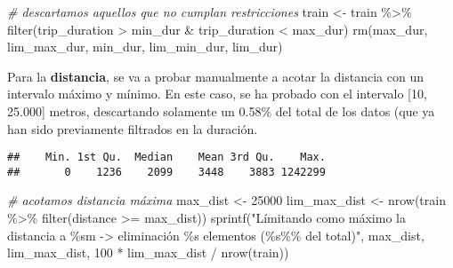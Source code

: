 \documentclass[
]{article}
\newenvironment{Shaded}{\begin{snugshade}}{\end{snugshade}}
\newcommand{\CommentTok}[1]{\textcolor[rgb]{0.56,0.35,0.01}{\textit{#1}}}
\newcommand{\DecValTok}[1]{\textcolor[rgb]{0.00,0.00,0.81}{#1}}
\newcommand{\FunctionTok}[1]{\textcolor[rgb]{0.00,0.00,0.00}{#1}}
\newcommand{\NormalTok}[1]{#1}
\newcommand{\OtherTok}[1]{\textcolor[rgb]{0.56,0.35,0.01}{#1}}
\newcommand{\SpecialCharTok}[1]{\textcolor[rgb]{0.00,0.00,0.00}{#1}}
\newcommand{\StringTok}[1]{\textcolor[rgb]{0.31,0.60,0.02}{#1}}
\begin{document}
\begin{Shaded}
\begin{Highlighting}[]
\CommentTok{\# descartamos aquellos que no cumplan restricciones}
\NormalTok{train }\OtherTok{\textless{}{-}}\NormalTok{ train }\SpecialCharTok{\%\textgreater{}\%} \FunctionTok{filter}\NormalTok{(trip\_duration }\SpecialCharTok{\textgreater{}}\NormalTok{ min\_dur }\SpecialCharTok{\&}\NormalTok{ trip\_duration }\SpecialCharTok{\textless{}}\NormalTok{ max\_dur)}
\FunctionTok{rm}\NormalTok{(max\_dur, lim\_max\_dur, min\_dur, lim\_min\_dur, lim\_dur)}
\end{Highlighting}
\end{Shaded}

Para la \textbf{distancia}, se va a probar manualmente a acotar la
distancia con un intervalo máximo y mínimo. En este caso, se ha probado
con el intervalo {[}10, 25.000{]} metros, descartando solamente un
0.58\% del total de los datos (que ya han sido previamente filtrados en
la duración.

\begin{Shaded}
\end{Shaded}

\begin{verbatim}
##    Min. 1st Qu.  Median    Mean 3rd Qu.    Max. 
##       0    1236    2099    3448    3883 1242299
\end{verbatim}

\begin{Shaded}
\begin{Highlighting}[]
\CommentTok{\# acotamos distancia máxima}
\NormalTok{max\_dist }\OtherTok{\textless{}{-}} \DecValTok{25000}
\NormalTok{lim\_max\_dist }\OtherTok{\textless{}{-}} \FunctionTok{nrow}\NormalTok{(train }\SpecialCharTok{\%\textgreater{}\%} \FunctionTok{filter}\NormalTok{(distance }\SpecialCharTok{\textgreater{}=}\NormalTok{ max\_dist))}
\FunctionTok{sprintf}\NormalTok{(}\StringTok{"Límitando como máximo la distancia a \%sm {-}\textgreater{} eliminación \%s elementos (\%s\%\% del total)"}\NormalTok{, max\_dist, lim\_max\_dist, }\DecValTok{100} \SpecialCharTok{*}\NormalTok{ lim\_max\_dist }\SpecialCharTok{/} \FunctionTok{nrow}\NormalTok{(train))}
\end{Highlighting}
\end{Shaded}
\end{document}

